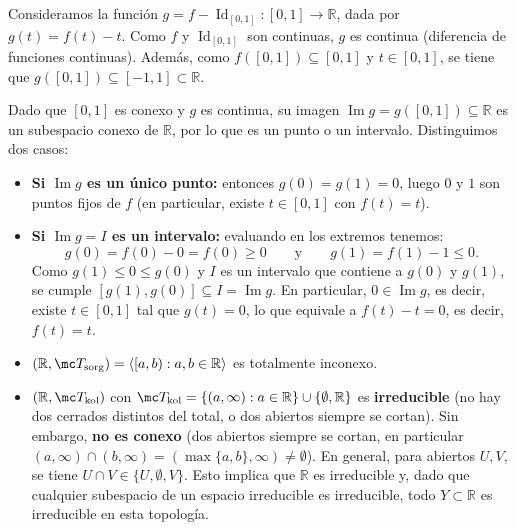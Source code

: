 \begin{dem}
Consideramos la función $g = f - \operatorname{Id}_{[0,1]} \colon [0,1] \to \mathbb{R}$, dada por $g(t) = f(t) - t$. Como $f$ y $\operatorname{Id}_{[0,1]}$ son continuas, $g$ es continua (diferencia de funciones continuas). Además, como $f([0,1]) \subseteq [0,1]$ y $t \in [0,1]$, se tiene que $g([0,1]) \subseteq [-1, 1] \subset \mathbb{R}$.

Dado que $[0,1]$ es conexo y $g$ es continua, su imagen $\operatorname{Im} g = g([0,1]) \subseteq \mathbb{R}$ es un subespacio conexo de $\mathbb{R}$, por lo que es un punto o un intervalo. Distinguimos dos casos:
\begin{itemize}
    \item \textbf{Si $\operatorname{Im} g$ es un único punto:} entonces $g(0) = g(1) = 0$, luego $0$ y $1$ son puntos fijos de $f$ (en particular, existe $t \in [0,1]$ con $f(t) = t$).
    \item \textbf{Si $\operatorname{Im} g = I$ es un intervalo:} evaluando en los extremos tenemos:
    \[
        g(0) = f(0) - 0 = f(0) \ge 0 \qquad \text{y} \qquad g(1) = f(1) - 1 \le 0.
    \]
    Como $g(1) \le 0 \le g(0)$ y $I$ es un intervalo que contiene a $g(0)$ y $g(1)$, se cumple $[g(1), g(0)] \subseteq I = \operatorname{Im} g$. En particular, $0 \in \operatorname{Im} g$, es decir, existe $t \in [0,1]$ tal que $g(t) = 0$, lo que equivale a $f(t) - t = 0$, es decir, $f(t) = t$.
\end{itemize}
\end{dem}
\begin{ejems}
\begin{itemize}
    \item $(\mathbb{R}, \mc T_{\mathrm{sorg}}) = \langle [a,b) : a,b \in \mathbb{R} \rangle$ es totalmente inconexo.

    \item $(\mathbb{R}, \mc T_{\mathrm{kol}})$ con $\mc T_{\mathrm{kol}} = \{(a,\infty) : a \in \mathbb{R}\} \cup \{\emptyset, \mathbb{R}\}$ es \textbf{irreducible} (no hay dos cerrados distintos del total, o dos abiertos siempre se cortan). Sin embargo, \textbf{no es conexo} (dos abiertos siempre se cortan, en particular $(a,\infty) \cap (b,\infty) = (\max\{a,b\}, \infty) \neq \emptyset$). En general, para abiertos $U, V$, se tiene $U \cap V \in \{U, \emptyset, V\}$. Esto implica que $\mathbb{R}$ es irreducible y, dado que cualquier subespacio de un espacio irreducible es irreducible, todo $Y \subset \mathbb{R}$ es irreducible en esta topología.
\end{itemize}
\end{ejems}


